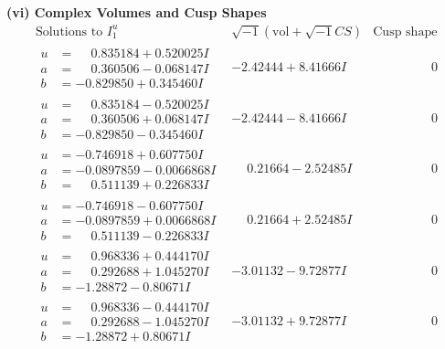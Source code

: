 \documentclass[1p]{elsarticle_modified}
\theoremstyle{definition}
\newcommand{\I}{\sqrt{-1}}
\begin{document}
\newpage\flushleft \textbf{(vi) Complex Volumes and Cusp Shapes}
$$\begin{array}{c|c|c}  
\text{Solutions to }I^u_{1}& \I (\text{vol} + \sqrt{-1}CS) & \text{Cusp shape}\\
 \hline 
\begin{aligned}
u &= \phantom{-}0.835184 + 0.520025 I \\
a &= \phantom{-}0.360506 - 0.068147 I \\
b &= -0.829850 + 0.345460 I\end{aligned}
 & -2.42444 + 8.41666 I & \phantom{-0.000000 } 0 \\ \hline\begin{aligned}
u &= \phantom{-}0.835184 - 0.520025 I \\
a &= \phantom{-}0.360506 + 0.068147 I \\
b &= -0.829850 - 0.345460 I\end{aligned}
 & -2.42444 - 8.41666 I & \phantom{-0.000000 } 0 \\ \hline\begin{aligned}
u &= -0.746918 + 0.607750 I \\
a &= -0.0897859 - 0.0066868 I \\
b &= \phantom{-}0.511139 + 0.226833 I\end{aligned}
 & \phantom{-}0.21664 - 2.52485 I & \phantom{-0.000000 } 0 \\ \hline\begin{aligned}
u &= -0.746918 - 0.607750 I \\
a &= -0.0897859 + 0.0066868 I \\
b &= \phantom{-}0.511139 - 0.226833 I\end{aligned}
 & \phantom{-}0.21664 + 2.52485 I & \phantom{-0.000000 } 0 \\ \hline\begin{aligned}
u &= \phantom{-}0.968336 + 0.444170 I \\
a &= \phantom{-}0.292688 + 1.045270 I \\
b &= -1.28872 - 0.80671 I\end{aligned}
 & -3.01132 - 9.72877 I & \phantom{-0.000000 } 0 \\ \hline\begin{aligned}
u &= \phantom{-}0.968336 - 0.444170 I \\
a &= \phantom{-}0.292688 - 1.045270 I \\
b &= -1.28872 + 0.80671 I\end{aligned}
 & -3.01132 + 9.72877 I & \phantom{-0.000000 } 0 \\ \hline\begin{aligned}

\end{aligned}
\end{array}$$
\end{document}
